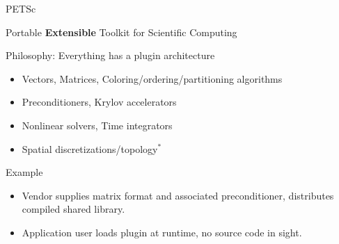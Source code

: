 \begin{frame}{PETSc}

\begin{center}Portable {\bf Extensible} Toolkit for Scientific Computing \end{center}

\begin{block}{Philosophy: Everything has a plugin architecture}
\begin{itemize}
  \item Vectors, Matrices, Coloring/ordering/partitioning algorithms
  \item Preconditioners, Krylov accelerators
  \item Nonlinear solvers, Time integrators
  \item Spatial discretizations/topology$^*$
\end{itemize}

\end{block}

\begin{block}{Example}
  \begin{itemize}
   \item Vendor supplies matrix format and associated preconditioner, distributes
	compiled shared library.  
   \item Application user loads plugin at runtime, no source
	code in sight.
  \end{itemize}
\end{block}

 \vspace{2cm}
\end{frame}


